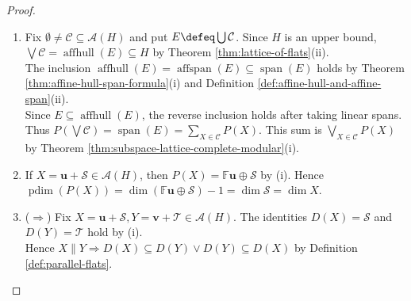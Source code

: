 \begin{theorem}
\begin{proof}
\begin{enumerate}[label=(\roman*)]
The identity $\bigcap\mathcal{C}=\mathbf{z}+\bigcap\limits_{X\in\mathcal{C}}\mathcal{S}_X$ holds by Lemma \ref{lem:intersection-of-flats}. The identity $(\forall\,X\in\mathcal{C})\,P(X)=\mathbb{F}\mathbf{z}\oplus\mathcal{S}_X$ holds by (i).\\
Fix $\mathbf{w}\in\bigcap\limits_{X\in\mathcal{C}}P(X)$ and choose $X_0\in\mathcal{C}$. Write $\mathbf{w}=a\mathbf{z}+\mathbf{s}_0$ with $\mathbf{s}_0\in\mathcal{S}_{X_0}$.  For $X\in\mathcal{C}$, write $\mathbf{w}=b_X\mathbf{z}+\mathbf{s}_X$ with $\mathbf{s}_X\in\mathcal{S}_X$.\\
Then $(a-b_X)\mathbf{z}=\mathbf{s}_X-\mathbf{s}_0\in\mathcal{K}$, so $a=b_X$. Hence $\mathbf{w}-a\mathbf{z}\in\bigcap\limits_{X\in\mathcal{C}}\mathcal{S}_X$.\\
Conversely, $(\forall\,X\in\mathcal{C})\,\mathbb{F}\mathbf{z}\oplus\bigcap\limits_{Y\in\mathcal{C}}\mathcal{S}_Y\subseteq P(X)$. Therefore $\bigcap\limits_{X\in\mathcal{C}}P(X)=\mathbb{F}\mathbf{z}\oplus\bigcap\limits_{X\in\mathcal{C}}\mathcal{S}_X=P(\bigcap\mathcal{C})$.
\item[$(v)$] Fix $\emptyset\neq\mathcal{C}\subseteq\mathcal{A}(H)$ and put $E\defeq\bigcup\mathcal{C}$. Since $H$ is an upper bound, $\bigvee\mathcal{C}=\operatorname{affhull}(E)\subseteq H$ by Theorem \ref{thm:lattice-of-flats}(ii).\\
The inclusion $\operatorname{affhull}(E)=\operatorname{affspan}(E)\subseteq\operatorname{span}(E)$ holds by Theorem \ref{thm:affine-hull-span-formula}(i) and Definition \ref{def:affine-hull-and-affine-span}(ii).\\
Since $E\subseteq\operatorname{affhull}(E)$, the reverse inclusion holds after taking linear spans.\\
Thus $P(\bigvee\mathcal{C})=\operatorname{span}(E)=\sum\limits_{X\in\mathcal{C}}P(X)$. This sum is $\bigvee\limits_{X\in\mathcal{C}}P(X)$ by Theorem \ref{thm:subspace-lattice-complete-modular}(i).
\item[$(vi)$] If $X=\mathbf{u}+\mathcal{S}\in\mathcal{A}(H)$, then $P(X)=\mathbb{F}\mathbf{u}\oplus\mathcal{S}$ by (i). Hence $\operatorname{pdim}(P(X))=\dim(\mathbb{F}\mathbf{u}\oplus\mathcal{S})-1=\dim\mathcal{S}=\dim X$.
\item[$(vii)$] ($\Rightarrow$) Fix $X=\mathbf{u}+\mathcal{S},Y=\mathbf{v}+\mathcal{T}\in\mathcal{A}(H)$. The identities $D(X)=\mathcal{S}$ and $D(Y)=\mathcal{T}$ hold by (i).\\
Hence $X\parallel Y\Rightarrow D(X)\subseteq D(Y)\lor D(Y)\subseteq D(X)$ by Definition \ref{def:parallel-flats}.

\end{enumerate}
\end{proof}
\end{theorem}
